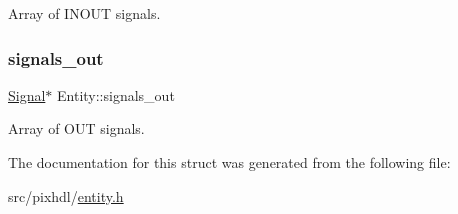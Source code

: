 Array of I\+N\+O\+UT signals. \mbox{\label{struct_entity_a4b9a333d9fb207c09d9f64e87d986ad6}} 
\subsubsection{\texorpdfstring{signals\_out}{signals\_out}}
{\footnotesize\ttfamily \mbox{\hyperlink{struct_signal}{Signal}}$\ast$ Entity\+::signals\+\_\+out}

Array of O\+UT signals. 

The documentation for this struct was generated from the following file\+:\begin{DoxyCompactItemize}
\item 
src/pixhdl/\mbox{\hyperlink{entity_8h}{entity.\+h}}\end{DoxyCompactItemize}
